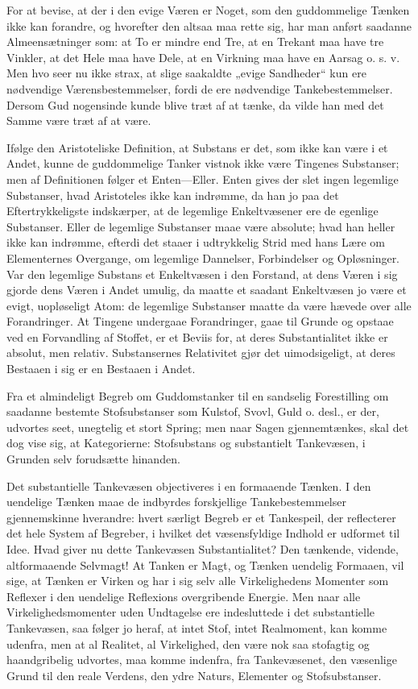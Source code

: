 \documentclass[12pt,a4paper]{book}
\begin{document}
For at bevise, at der i den evige Væren er Noget, som den guddommelige
Tænken ikke kan forandre, og hvorefter den altsaa maa rette sig, har man
anført saadanne Almeensætninger som: at To er mindre end Tre, at en
Trekant maa have tre Vinkler, at det Hele maa have Dele, at en Virkning
maa have en Aarsag o. s. v. Men hvo seer nu ikke strax, at slige saakaldte
„evige Sandheder“ kun ere nødvendige Værensbestemmelser, fordi de ere
nødvendige Tankebestemmelser. Dersom Gud nogensinde kunde blive træt af at
tænke, da vilde han med det Samme være træt af at være.

Ifølge den Aristoteliske Definition, at Substans er det, som ikke kan være
i et Andet, kunne de guddommelige Tanker vistnok ikke være Tingenes
Substanser; men af Definitionen følger et Enten---Eller. Enten gives der
slet ingen legemlige Substanser, hvad Aristoteles ikke kan indrømme, da
han jo paa det Eftertrykkeligste indskærper, at de legemlige
Enkeltvæsener ere de egenlige Substanser. Eller de legemlige Substanser
maae være absolute; hvad han heller ikke kan indrømme, efterdi det staaer
i udtrykkelig Strid med hans Lære om Elementernes Overgange, om legemlige
Dannelser, Forbindelser og Opløsninger. Var den legemlige Substans et
Enkeltvæsen i den Forstand, at dens Væren i sig gjorde dens Væren i Andet
umulig, da maatte et saadant Enkeltvæsen jo være et evigt, uopløseligt
Atom: de legemlige Substanser maatte da være hævede over alle
Forandringer. At Tingene undergaae Forandringer, gaae til Grunde og
opstaae ved en Forvandling af Stoffet, er et Beviis for, at deres
Substantialitet ikke er absolut, men relativ. Substansernes Relativitet
gjør det uimodsigeligt, at deres Bestaaen i sig er en Bestaaen i Andet.

Fra et almindeligt Begreb om Guddomstanker til en sandselig Forestilling
om saadanne bestemte Stofsubstanser som Kulstof, Svovl, Guld o. desl., er
der, udvortes seet,
unegtelig et stort Spring; men naar Sagen gjennemtænkes, skal det dog vise
sig, at Kategorierne: Stofsubstans og substantielt Tankevæsen, i Grunden
selv forudsætte hinanden.

Det substantielle Tankevæsen objectiveres i en formaaende Tænken. I den
uendelige Tænken maae de indbyrdes forskjellige Tankebestemmelser
gjennemskinne hverandre: hvert særligt Begreb er et Tankespeil, der
reflecterer det hele System af Begreber, i hvilket det væsensfyldige
Indhold er udformet til Idee. Hvad giver nu dette Tankevæsen
Substantialitet? Den tænkende, vidende, altformaaende Selvmagt! At Tanken
er Magt, og Tænken uendelig Formaaen, vil sige, at Tænken er Virken og har
i sig selv alle Virkelighedens Momenter som Reflexer i den uendelige
Reflexions overgribende Energie. Men naar alle Virkelighedsmomenter uden
Undtagelse ere indesluttede i det substantielle Tankevæsen, saa følger jo
heraf, at intet Stof, intet Realmoment, kan komme udenfra, men at al
Realitet, al Virkelighed, den være nok saa stofagtig og haandgribelig
udvortes, maa komme indenfra, fra Tankevæsenet, den væsenlige Grund til
den reale Verdens, den ydre Naturs, Elementer og Stofsubstanser.
\end{document}
